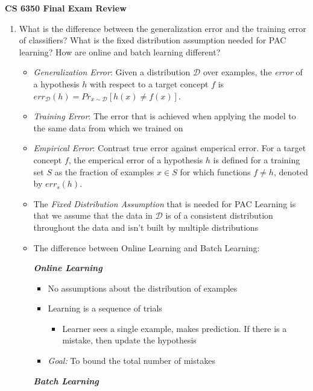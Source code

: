 \documentclass{article}
\renewcommand{\dim}{\mathcal{D}}
\begin{document}
\begin{center}
{\huge \bf CS 6350 Final Exam Review}
\end{center}

\begin{enumerate}
\item What is the difference between the generalization error and the training error of classifiers? What is the fixed distribution assumption needed for PAC learning? How are online and batch learning different?
\begin{itemize}
\item {\em Generalization Error}: Given a distribution $\mathcal{D}$ over examples, the {\em error} of a hypothesis $h$ with respect to a target concept $f$ is $err_{\mathcal{D}}(h) = Pr_{x\sim\mathcal{D}}\left[h(x)\neq f(x)\right]$.
\item {\em Training Error}: The error that is achieved when applying the model to the same data from which we trained on
\item {\em Empirical Error}: Contrast true error against emperical error. For a target concept $f$, the emperical error of a hypothesis $h$ is defined for a training set $S$ as the fraction of examples $x\in S$ for which functions $f\neq h$, denoted by $err_{s}(h)$.
\item The {\em Fixed Distribution Assumption} that is needed for PAC Learning is that we assume that the data in $\dim$ is of a consistent distribution throughout the data and isn't built by multiple distributions
\item The difference between Online Learning and Batch Learning: 
\begin{center}
\noindent\parbox[t]{.4\textwidth}{\raggedright%
\textbf{\textit{Online Learning}}
\begin{itemize}[topsep=0pt,itemsep=-2pt,leftmargin=13pt]
\item No assumptions about the distribution of examples
\item Learning is a sequence of trials
\begin{itemize}[topsep=0pt,itemsep=-2pt,leftmargin=13pt]
\item Learner sees a single example, makes prediction. If there is a mistake, then update the hypothesis
\end{itemize}
\item {\em Goal:} To bound the total number of mistakes 
\end{itemize}
}%
\parbox[t]{.4\textwidth}{\raggedright%
\textbf{\textit{Batch Learning}}
\begin{itemize}[topsep=0pt,itemsep=-2pt,leftmargin=13pt]

\end{itemize}}
\end{center}
\end{itemize}
\end{enumerate}
\end{document}
